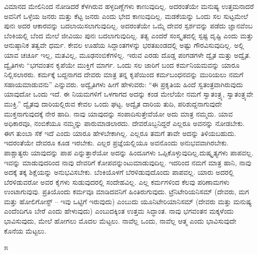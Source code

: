 ವಿಮಾನದ ಮೇಲಿನಿಂದ ನೋಡಿದರೆ ಕೆಳಗಿರುವ ಹಳ್ಳದಿಣ್ಣೆಗಳು ಕಾಣುವುದಿಲ್ಲ. ಅದರಂತೆಯೇ ಮನುಷ್ಯ ಉತ್ತಮನಾದರೆ ಅವನಿಗೆ ಒಳ್ಳೆಯ ಜನರು ಮತ್ತು ಕೆಟ್ಟ ಜನರು ಎಂದು ಭೇದ ಕಾಣುವುದಿಲ್ಲ. ಮಡಕೆಯನ್ನು ಒಂದು ಸಲ ಸುಟ್ಟಮೇಲೆ ಪುನಃ ಅದರ ಆಕಾರವನ್ನು ಬದಲಾಯಿಸಲಾಗುವುದಿಲ್ಲ. ಅದರಂತೆಯೇ ಒಮ್ಮೆ ದೇವರ ಸ್ಪರ್ಶವನ್ನು ಪಡೆದು ಜ್ಞಾನವೆಂಬ ಬೆಂಕಿಯಲ್ಲಿ ಬೆಂದ ಮೇಲೆ ಜೀವಿಯು ಪುನಃ ಬದಲಾಗುವುದಿಲ್ಲ. ತತ್ವ ಎಂದರೆ ಸಂಸ್ಕೃತದಲ್ಲಿ ಸ್ಪಷ್ಟ ದೃಷ್ಟಿ ಎಂದು ಮತ್ತು ಆನುಷ್ಠಾನಿಕ ತತ್ವವೇ ಧರ್ಮ. ಕೇವಲ ಊಹೆಯ ಸಿದ್ದಾಂತಗಳನ್ನು ಭರತಖಂಡದಲ್ಲಿ ಅಷ್ಟು ಗೌರವಿಸುವುದಿಲ್ಲ. ಅಲ್ಲಿ ಯಾವ ಚರ್ಚೂ ಇಲ್ಲ, ಮತವಿಲ್ಲ, ಮೂಢನಂಬಿಕೆಗಳಿಲ್ಲ. ಇರುವ ಎರಡು ದೊಡ್ಡ ಪಂಗಡಗಳೇ ದ್ವೈತ ಮತ್ತು ಅದ್ವೈತ. ದ್ವೈತಿಗಳು “ಭಗವಂತನ ಕೃಪೆಯೇ ಮುಕ್ತಿಗೆ ಮಾರ್ಗ. ಒಂದು ಸಲ ಜಾರಿಗೆ ಬಂದ ಕರ್ಮನಿಯಮವನ್ನು ಯಾರೂ ನಿಲ್ಲಿಸಲಾರರು. ಕರ್ಮಕ್ಕೆ ಬದ್ದನಾಗದ ದೇವರು ಮಾತ್ರ ತನ್ನ ಕೃಪೆಯಿಂದ ಕರ್ಮಬಂಧನವನ್ನು ಮುರಿಯಲು ನಮಗೆ ಸಹಾಯಮಾಡುವನು” ಎನ್ನುವರು. ಅದ್ವೈತಿಗಳು ಹೀಗೆ ಹೇಳುವರು: “ಈ ಪ್ರಕೃತಿಯ ಹಿಂದೆ ಸ್ವತಂತ್ರವಾಗಿರುವುದು ಯಾವುದೋ ಒಂದು ಇದೆ. ಈ ನಿಯಮಗಳಿಗೆ ಒಳಗಾಗದ ಅದನ್ನು ಕಂಡ ಮೇಲೆಯೇ ನಮಗೆ ಸ್ವಾತಂತ್ರ್ಯ, ಸ್ವಾತಂತ್ರ್ಯವೇ ಮುಕ್ತಿ.” ದ್ವೈತವು ದಾರಿಯಲ್ಲಿರುವ ಕೇವಲ ಒಂದು ಘಟ್ಟ. ಅದ್ವೈತ ದಾರಿಯ ತುದಿ, ಪರಿಶುದ್ದನಾಗುವುದೇ ಮುಕ್ತನಾಗುವುದಕ್ಕೆ ನೇರ ಹಾದಿ. ನಾವು ಯಾವುದನ್ನು ಸಂಪಾದಿಸುತ್ತೇವೆಯೋ ಅದು ಮಾತ್ರ ನಮ್ಮದು. ಯಾವ ಅಧಿಕಾರವೂ, ನಂಬಿಕೆಯೂ ನಮ್ಮನ್ನು ಪಾರುಮಾಡಲಾರದು. ದೇವರೊಬ್ಬನಿದ್ದರೆ ಎಲ್ಲರೂ ಅವನನ್ನು ನೋಡಬೇಕು. ಈಗ ತುಂಬಾ ಸೆಕೆ ಇದೆ ಎಂದು ಯಾರೂ ಹೇಳಬೇಕಾಗಿಲ್ಲ. ಎಲ್ಲರೂ ತಮಗೆ ತಾವೇ ಅದನ್ನು ತಿಳಿಯಬಹುದು. ಇದರಂತೆಯೇ ದೇವರೂ ಕೂಡ ಇರಬೇಕು. ಎಲ್ಲರ ಪ್ರಜ್ಞೆಯಲ್ಲಿಯೂ ಅವನೊಂದು ಅನುಭವವಾಗಿರಬೇಕು. ಪಾಶ್ಚಾತ್ಯರು ಯಾವುದನ್ನು ಪಾಪ ಎನ್ನುತ್ತಾರೆಯೋ ಅದನ್ನು ಹಿಂದೂಗಳು ಒಪ್ಪಿಕೊಳ್ಳುವುದಿಲ್ಲ.\break ದುಷ್ಕೃತ್ಯಗಳು ಪಾಪವಲ್ಲ. ಇವನ್ನು ಮಾಡುವುದರಿಂದ ನಾವು ದೇವರಿಗೆ ಕೋಪವನ್ನುಂಟುಮಾಡುವುದಿಲ್ಲ. ಇದರಿಂದ ನಮಗೆ ಮಾತ್ರ ಹಾನಿ, ನಾವು ಅದಕ್ಕೆ ತಕ್ಕ ಶಿಕ್ಷೆಯನ್ನು ಅನುಭವಿಸಬೇಕು. ಬೆಂಕಿಯೊಳಗೆ ಬೆರಳಿಡುವುದೊಂದು ಪಾಪವಲ್ಲ. ಯಾರು ಅದರಲ್ಲಿ ಬೆರಳಿಡುವರೋ ಅವರ ಕೈಗಳು ಸುಡುವುದರಲ್ಲಿ ಸಂದೇಹವಿಲ್ಲ. ಎಲ್ಲ ಕರ್ಮಗಳಿಂದ ಕೆಲವು ಪರಿಣಾಮಗಳು ಉಂಟಾಗುವುವು. ಪ್ರತಿಯೊಂದು ಕರ್ಮವೂ ಮಾಡಿದವನಿಗೆ ಹಿಂತಿರುಗುವುದು. ಟ್ರೆನಿಟೇರಿಯನಿಸಮ್ (ದೇವರು, ಮಗ ಮತ್ತು ಹೋಲಿಗೋಸ್ಟ್ – ಇವು ಒಟ್ಟಿಗೆ ಇರುವುದು) ಎಂಬುದು ಯೂನಿಟೇರಿಯಾನಿಸಮ್ (ದೇವರು ಮತ್ತು ಮನುಷ್ಯ ಎಂದೆಂದಿಗೂ ಬೇರೆ ಎಂದು ಹೇಳುವುದು) ಎಂಬುದಕ್ಕಿಂತ ಉತ್ತಮ ಸಿದ್ಧಾಂತ. ನಾವು ಭಗವಂತನ ಮಕ್ಕಳೆಂದು ಭಾವಿಸುವುದು, ಮೇಲೆ ಹೋಗಲು ಮೊದಲ ಮೆಟ್ಟಲು. ನಾವೆಲ್ಲ ಒಂದು, ನಾವೆಲ್ಲ ಆತ್ಮ ಎಂದು ಭಾವಿಸುವುದೇ ಕೊನೆಯ ಮೆಟ್ಟಲು.

\begin{center}
೫
\end{center}

